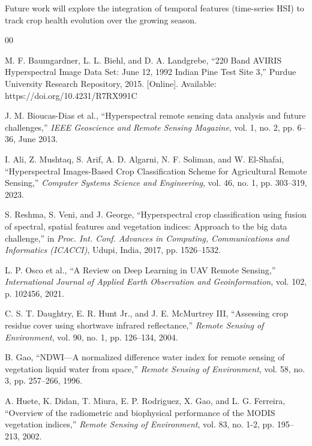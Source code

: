 \documentclass[conference]{IEEEtran}
\begin{document}
Future work will explore the integration of temporal features (time-series HSI) to track crop health evolution over the growing season.

\begin{thebibliography}{00}

 M. F. Baumgardner, L. L. Biehl, and D. A. Landgrebe, ``220 Band AVIRIS Hyperspectral Image Data Set: June 12, 1992 Indian Pine Test Site 3,'' Purdue University Research Repository, 2015. [Online]. Available: https://doi.org/10.4231/R7RX991C

 J. M. Bioucas-Dias et al., ``Hyperspectral remote sensing data analysis and future challenges,'' \textit{IEEE Geoscience and Remote Sensing Magazine}, vol. 1, no. 2, pp. 6--36, June 2013.

 I. Ali, Z. Mushtaq, S. Arif, A. D. Algarni, N. F. Soliman, and W. El-Shafai, ``Hyperspectral Images-Based Crop Classification Scheme for Agricultural Remote Sensing,'' \textit{Computer Systems Science and Engineering}, vol. 46, no. 1, pp. 303--319, 2023.

 S. Reshma, S. Veni, and J. George, ``Hyperspectral crop classification using fusion of spectral, spatial features and vegetation indices: Approach to the big data challenge,'' in \textit{Proc. Int. Conf. Advances in Computing, Communications and Informatics (ICACCI)}, Udupi, India, 2017, pp. 1526--1532.

 L. P. Osco et al., ``A Review on Deep Learning in UAV Remote Sensing,'' \textit{International Journal of Applied Earth Observation and Geoinformation}, vol. 102, p. 102456, 2021.

 C. S. T. Daughtry, E. R. Hunt Jr., and J. E. McMurtrey III, ``Assessing crop residue cover using shortwave infrared reflectance,'' \textit{Remote Sensing of Environment}, vol. 90, no. 1, pp. 126--134, 2004. %

 B. Gao, ``NDWI—A normalized difference water index for remote sensing of vegetation liquid water from space,'' \textit{Remote Sensing of Environment}, vol. 58, no. 3, pp. 257--266, 1996. %

 A. Huete, K. Didan, T. Miura, E. P. Rodriguez, X. Gao, and L. G. Ferreira, ``Overview of the radiometric and biophysical performance of the MODIS vegetation indices,'' \textit{Remote Sensing of Environment}, vol. 83, no. 1-2, pp. 195--213, 2002. %


\end{thebibliography}
\end{document}
